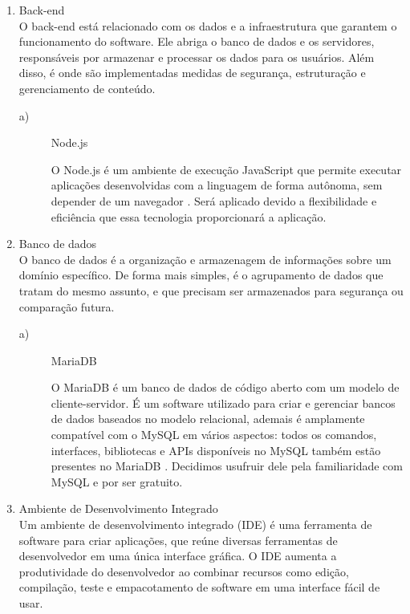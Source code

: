 \documentclass[
    article,			%
    12pt,				%
    oneside,            %
    a4paper,			%
    english,			%
    brazil,				%
    ]{abntex2}
\begin{document}
\begin{enumerate}
    \item Back-end \\
        O back-end está relacionado com os dados e a infraestrutura que garantem o funcionamento do software. Ele abriga o banco de dados e os servidores, responsáveis por armazenar e processar os dados para os usuários. Além disso, é onde são implementadas medidas de segurança, estruturação e gerenciamento de conteúdo. \\
        
\begin{description}
    \item[a)] Node.js \par O Node.js é um ambiente de execução JavaScript que permite executar aplicações desenvolvidas com a linguagem de forma autônoma, sem depender de um navegador \cite{node.js}. Será aplicado devido a flexibilidade e eficiência que essa tecnologia proporcionará a aplicação. \\
\end{description}

    \item Banco de dados \\
        O banco de dados é a organização e armazenagem de informações sobre um domínio específico. De forma mais simples, é o agrupamento de dados que tratam do mesmo assunto, e que precisam ser armazenados para segurança ou comparação futura. \\
        
\begin{description}
    \item[a)] MariaDB \par O MariaDB é um banco de dados de código aberto com um modelo de cliente-servidor. É um software utilizado para criar e gerenciar bancos de dados baseados no modelo relacional, ademais é amplamente compatível com o MySQL em vários aspectos: todos os comandos, interfaces, bibliotecas e APIs disponíveis no MySQL também estão presentes no MariaDB \cite{MariaBD}. Decidimos usufruir dele pela familiaridade com MySQL e por ser gratuito. \\
\end{description}

    \item Ambiente de Desenvolvimento Integrado \\
        Um ambiente de desenvolvimento integrado (IDE) é uma ferramenta de software para criar aplicações, que reúne diversas ferramentas de desenvolvedor em uma única interface gráfica. O IDE aumenta a produtividade do desenvolvedor ao combinar recursos como edição, compilação, teste e empacotamento de software em uma interface fácil de usar. \\
        

\end{enumerate}
\end{document}
